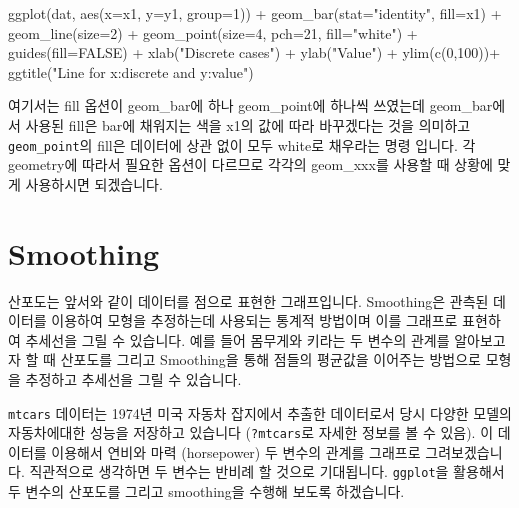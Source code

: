 \documentclass[
]{book}
\newenvironment{Shaded}{\begin{snugshade}}{\end{snugshade}}
\newcommand{\AttributeTok}[1]{\textcolor[rgb]{0.77,0.63,0.00}{#1}}
\newcommand{\ConstantTok}[1]{\textcolor[rgb]{0.00,0.00,0.00}{#1}}
\newcommand{\DecValTok}[1]{\textcolor[rgb]{0.00,0.00,0.81}{#1}}
\newcommand{\FunctionTok}[1]{\textcolor[rgb]{0.00,0.00,0.00}{#1}}
\newcommand{\NormalTok}[1]{#1}
\newcommand{\SpecialCharTok}[1]{\textcolor[rgb]{0.00,0.00,0.00}{#1}}
\newcommand{\StringTok}[1]{\textcolor[rgb]{0.31,0.60,0.02}{#1}}
\begin{document}
\begin{Shaded}
\begin{Highlighting}[]
\FunctionTok{ggplot}\NormalTok{(dat, }\FunctionTok{aes}\NormalTok{(}\AttributeTok{x=}\NormalTok{x1, }\AttributeTok{y=}\NormalTok{y1, }\AttributeTok{group=}\DecValTok{1}\NormalTok{)) }\SpecialCharTok{+}
  \FunctionTok{geom\_bar}\NormalTok{(}\AttributeTok{stat=}\StringTok{"identity"}\NormalTok{, }\AttributeTok{fill=}\NormalTok{x1) }\SpecialCharTok{+}
  \FunctionTok{geom\_line}\NormalTok{(}\AttributeTok{size=}\DecValTok{2}\NormalTok{) }\SpecialCharTok{+}
  \FunctionTok{geom\_point}\NormalTok{(}\AttributeTok{size=}\DecValTok{4}\NormalTok{, }\AttributeTok{pch=}\DecValTok{21}\NormalTok{, }\AttributeTok{fill=}\StringTok{"white"}\NormalTok{) }\SpecialCharTok{+}
  \FunctionTok{guides}\NormalTok{(}\AttributeTok{fill=}\ConstantTok{FALSE}\NormalTok{) }\SpecialCharTok{+}
  \FunctionTok{xlab}\NormalTok{(}\StringTok{"Discrete cases"}\NormalTok{) }\SpecialCharTok{+} \FunctionTok{ylab}\NormalTok{(}\StringTok{"Value"}\NormalTok{) }\SpecialCharTok{+}
  \FunctionTok{ylim}\NormalTok{(}\FunctionTok{c}\NormalTok{(}\DecValTok{0}\NormalTok{,}\DecValTok{100}\NormalTok{))}\SpecialCharTok{+}
  \FunctionTok{ggtitle}\NormalTok{(}\StringTok{"Line for x:discrete and y:value"}\NormalTok{)}
\end{Highlighting}
\end{Shaded}

여기서는 fill 옵션이 geom\_bar에 하나 geom\_point에 하나씩 쓰였는데 geom\_bar에서 사용된 fill은 bar에 채워지는 색을 x1의 값에 따라 바꾸겠다는 것을 의미하고 \texttt{geom\_point}의 fill은 데이터에 상관 없이 모두 white로 채우라는 명령 입니다. 각 geometry에 따라서 필요한 옵션이 다르므로 각각의 geom\_xxx를 사용할 때 상황에 맞게 사용하시면 되겠습니다.

\hypertarget{smoothing}{%
\section{Smoothing}\label{smoothing}}

산포도는 앞서와 같이 데이터를 점으로 표현한 그래프입니다. Smoothing은 관측된 데이터를 이용하여 모형을 추정하는데 사용되는 통계적 방법이며 이를 그래프로 표현하여 추세선을 그릴 수 있습니다. 예를 들어 몸무게와 키라는 두 변수의 관계를 알아보고자 할 때 산포도를 그리고 Smoothing을 통해 점들의 평균값을 이어주는 방법으로 모형을 추정하고 추세선을 그릴 수 있습니다.

\texttt{mtcars} 데이터는 1974년 미국 자동차 잡지에서 추출한 데이터로서 당시 다양한 모델의 자동차에대한 성능을 저장하고 있습니다 (\texttt{?mtcars}로 자세한 정보를 볼 수 있음). 이 데이터를 이용해서 연비와 마력 (horsepower) 두 변수의 관계를 그래프로 그려보겠습니다. 직관적으로 생각하면 두 변수는 반비례 할 것으로 기대됩니다. \texttt{ggplot}을 활용해서 두 변수의 산포도를 그리고 smoothing을 수행해 보도록 하겠습니다.
\end{document}
